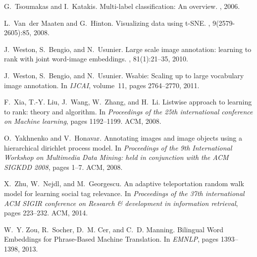 \documentclass[10pt,twocolumn,letterpaper]{article}
\begin{document}
\begin{thebibliography}{10}
G.~Tsoumakas and I.~Katakis.
\newblock Multi-label classification: {An} overview.
, 2006.

L.~Van~der Maaten and G.~Hinton.
\newblock Visualizing data using t-{SNE}.
, 9(2579-2605):85, 2008.

J.~Weston, S.~Bengio, and N.~Usunier.
\newblock Large scale image annotation: learning to rank with joint word-image
  embeddings.
, 81(1):21--35, 2010.

J.~Weston, S.~Bengio, and N.~Usunier.
\newblock Wsabie: {Scaling} up to large vocabulary image annotation.
\newblock In {\em {IJCAI}}, volume~11, pages 2764--2770, 2011.

F.~Xia, T.-Y. Liu, J.~Wang, W.~Zhang, and H.~Li.
\newblock Listwise approach to learning to rank: theory and algorithm.
\newblock In {\em Proceedings of the 25th international conference on {Machine}
  learning}, pages 1192--1199. ACM, 2008.

O.~Yakhnenko and V.~Honavar.
\newblock Annotating images and image objects using a hierarchical dirichlet
  process model.
\newblock In {\em Proceedings of the 9th {International} {Workshop} on
  {Multimedia} {Data} {Mining}: held in conjunction with the {ACM} {SIGKDD}
  2008}, pages 1--7. ACM, 2008.

X.~Zhu, W.~Nejdl, and M.~Georgescu.
\newblock An adaptive teleportation random walk model for learning social tag
  relevance.
\newblock In {\em Proceedings of the 37th international {ACM} {SIGIR}
  conference on {Research} \& development in information retrieval}, pages
  223--232. ACM, 2014.

W.~Y. Zou, R.~Socher, D.~M. Cer, and C.~D. Manning.
\newblock Bilingual {Word} {Embeddings} for {Phrase}-{Based} {Machine}
  {Translation}.
\newblock In {\em {EMNLP}}, pages 1393--1398, 2013.

\end{thebibliography}
\end{document}
